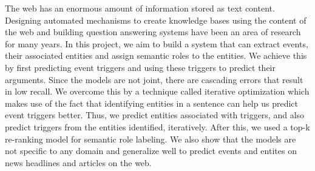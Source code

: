 The web has an enormous amount of information stored as text content. Designing automated mechanisms to create knowledge bases using the content of the web and building question answering systems have been an area of research for many years. In this project, we aim to build a system that can extract events, their associated entities and assign semantic roles to the entities. We achieve this by first predicting event triggers and using these triggers to predict their arguments. Since the models are not joint, there are cascading errors that result in low recall. We overcome this by a technique called iterative optimization which makes use of the fact that identifying entities in a sentence can help us predict event triggers better. Thus, we predict entities associated with triggers, and also predict triggers from the entities identified, iteratively. After this, we used a top-k re-ranking model for semantic role labeling. We also show that the models are not specific to any domain and generalize well to predict events and entites on news headlines and articles on the web.